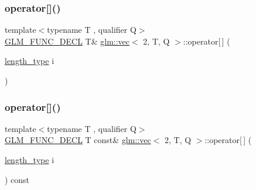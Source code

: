 \mbox{\label{structglm_1_1vec_3_012_00_01_t_00_01_q_01_4_abfa1d6705c2f4956cb7beccc917de27d}} 
\subsubsection{\texorpdfstring{operator[]()}{operator[]()}\hspace{0.1cm}{\footnotesize\ttfamily [1/2]}}
{\footnotesize\ttfamily template$<$typename T , qualifier Q$>$ \\
\hyperlink{setup_8hpp_ab2d052de21a70539923e9bcbf6e83a51}{G\+L\+M\+\_\+\+F\+U\+N\+C\+\_\+\+D\+E\+CL} T\& \hyperlink{structglm_1_1vec}{glm\+::vec}$<$ 2, T, Q $>$\+::operator\mbox{[}$\,$\mbox{]} (\begin{DoxyParamCaption}\item[{\hyperlink{structglm_1_1vec_3_012_00_01_t_00_01_q_01_4_af8b652526ec88c8513b2a8c05bf92441}{length\+\_\+type}}]{i }\end{DoxyParamCaption})}

\mbox{\label{structglm_1_1vec_3_012_00_01_t_00_01_q_01_4_ac475335b291db6f155d9d8f4ab3b6373}} 
\subsubsection{\texorpdfstring{operator[]()}{operator[]()}\hspace{0.1cm}{\footnotesize\ttfamily [2/2]}}
{\footnotesize\ttfamily template$<$typename T , qualifier Q$>$ \\
\hyperlink{setup_8hpp_ab2d052de21a70539923e9bcbf6e83a51}{G\+L\+M\+\_\+\+F\+U\+N\+C\+\_\+\+D\+E\+CL} T const\& \hyperlink{structglm_1_1vec}{glm\+::vec}$<$ 2, T, Q $>$\+::operator\mbox{[}$\,$\mbox{]} (\begin{DoxyParamCaption}\item[{\hyperlink{structglm_1_1vec_3_012_00_01_t_00_01_q_01_4_af8b652526ec88c8513b2a8c05bf92441}{length\+\_\+type}}]{i }\end{DoxyParamCaption}) const}

